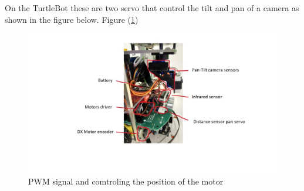\documentclass[english]{article}
\begin{document}
\newpage
On the TurtleBot these are two servo that control the tilt and pan of a camera
as shown in the figure below. Figure (\ref{fig:motor})
\begin{figure}[!h]
    \centering
    \includegraphics[width=1.10\textwidth, height=0.35\textheight]{figures/motor.png}
    \caption{PWM signal and comtroling the position of the motor}
    \label{fig:motor}
\end{figure}
\end{document}
